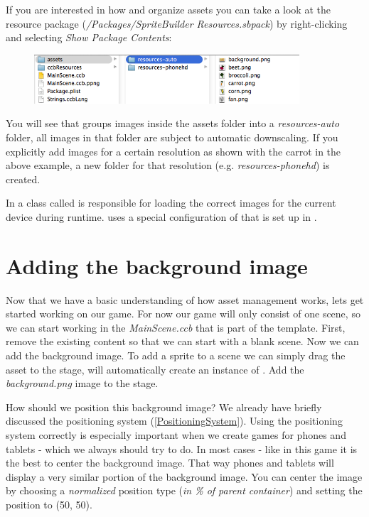 \begin{details}[frametitle={Behind the scenes}] 
If you are interested in how \SB{} and \cocos{} organize assets you can take a
look at the resource package
(\textit{/Packages/\allowbreak{}SpriteBuilder Resources\allowbreak{}.sbpack}) by
right-clicking and selecting \textit{Show Package Contents}:
\begin{figure}[H]
		\centering
		\includegraphics[width=280pt]{images/Chapter2/behindscenes_resourcepack.png}
\end{figure}
You will see that \SB{} groups images inside the assets folder into a
\textit{resources-auto} folder, all images in that folder are subject to
automatic downscaling. If you explicitly add images for a certain resolution as
shown with the carrot in the above example, a new folder for that resolution
(e.g. \textit{resources-phonehd}) is created.

In \cocos{} a class called  is responsible for loading
the correct images for the current device during runtime. \SB{} uses a special
configuration of  that is set up in
. 
\end{details}

\section{Adding the background image}
Now that we have a basic understanding of how asset management works, lets get
started working on our game. For now our game will only consist of one scene, so
we can start working in the \textit{MainScene.ccb} that is part of the \SB{}
template. First, remove the existing content so that we can start with a blank
scene. Now we can add the background image. To add a sprite to a scene we can
simply drag the asset to the stage, \SB{} will automatically create an instance
of \ccsprite{}. Add the \textit{background.png} image to the stage.

How should we position this background image? We already have briefly discussed
the \SB{} positioning system (\ref{PositioningSystem}). Using the positioning
system correctly is especially important when we create games for phones and tablets -
which we always should try to do. In most cases - like in this game it is the
best to center the background image. That way phones and tablets will display a
very similar portion of the background image. You can center the image by
choosing a \textit{normalized} position type (\textit{in \% of parent
container}) and setting the position to (50, 50).

